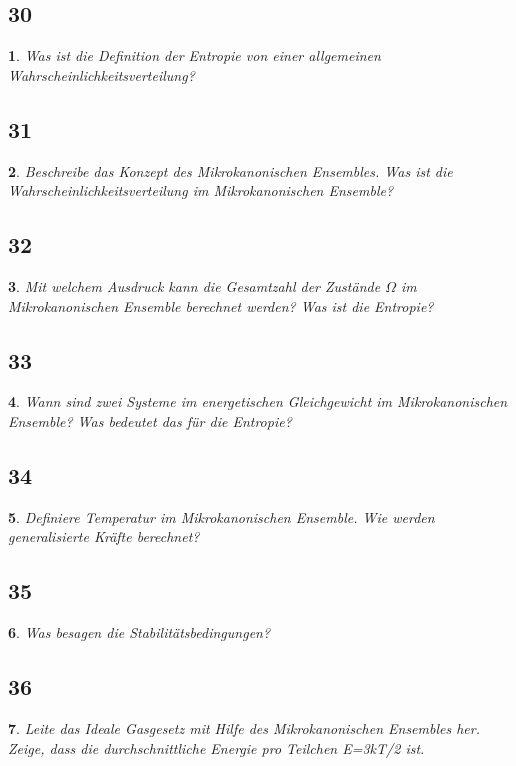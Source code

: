 \documentclass[12pt,a4paper]{report}
\newtheorem{myfrag}{}%
\begin{document}
\subsection{30}
\begin{myfrag}
Was ist die Definition der Entropie von einer allgemeinen Wahrscheinlichkeitsverteilung?
\end{myfrag}
\subsection{31}
\begin{myfrag}
Beschreibe das Konzept des Mikrokanonischen Ensembles. Was ist die
Wahrscheinlichkeitsverteilung im Mikrokanonischen Ensemble?
\end{myfrag}
\subsection{32}
\begin{myfrag}
Mit welchem Ausdruck kann die Gesamtzahl der Zustände $\Omega$ im
Mikrokanonischen Ensemble berechnet werden? Was ist die Entropie?
\end{myfrag}
\subsection{33}
\begin{myfrag}
Wann sind zwei Systeme im energetischen Gleichgewicht im Mikrokanonischen
Ensemble? Was bedeutet das für die Entropie?
\end{myfrag}
\subsection{34}
\begin{myfrag}
Definiere Temperatur im Mikrokanonischen Ensemble. Wie werden
generalisierte Kräfte berechnet?
\end{myfrag}
\subsection{35}
\begin{myfrag}
Was besagen die Stabilitätsbedingungen?
\end{myfrag}
\subsection{36}
\begin{myfrag}
Leite das Ideale Gasgesetz mit Hilfe des Mikrokanonischen Ensembles her.
Zeige, dass die durchschnittliche Energie pro Teilchen E=3kT/2 ist.
\end{myfrag}
\end{document}
